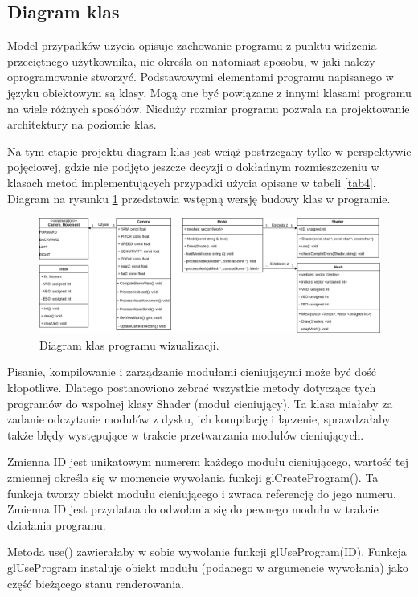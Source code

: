 \subsection{Diagram klas}
Model przypadków użycia opisuje zachowanie programu z punktu widzenia przeciętnego użytkownika, nie określa on natomiast sposobu, w jaki
należy oprogramowanie stworzyć. Podstawowymi elementami programu napisanego w języku obiektowym są klasy. Mogą one być powiązane z innymi klasami programu na wiele różnych sposóbów. Nieduży rozmiar programu pozwala na projektowanie architektury na poziomie klas.

Na tym etapie projektu diagram klas jest wciąż postrzegany tylko w perspektywie pojęciowej, gdzie nie podjęto jeszcze decyzji o dokładnym rozmieszczeniu w klasach metod implementujących przypadki użycia opisane w tabeli \ref{tab4}. Diagram na rysunku \ref{rys24} przedstawia wstępną wersję budowy klas w programie. 

\begin{figure}[H]
		\centering
 		\includegraphics[width=16.0cm]{DiagramKlas.png}
    	\caption{Diagram klas programu wizualizacji.}
 		\label{rys24}
\end{figure}


Pisanie, kompilowanie i zarządzanie modułami cieniującymi może być dość kłopotliwe. Dlatego postanowiono zebrać wszystkie metody dotyczące tych programów do wspolnej klasy Shader (moduł cieniujący). Ta klasa miałaby za zadanie odczytanie modułów z dysku, ich kompilację i łączenie, sprawdzałaby także błędy występujące w trakcie przetwarzania modułów cieniujących.

Zmienna ID jest unikatowym numerem każdego modułu cieniującego, wartość tej zmiennej określa się w momencie wywołania funkcji glCreateProgram(). Ta funkcja tworzy obiekt modułu cieniującego i zwraca referencję do jego numeru. Zmienna ID jest przydatna do odwołania się do pewnego modułu w trakcie działania programu.

Metoda use() zawierałaby w sobie wywołanie funkcji glUseProgram(ID). Funkcja glUseProgram instaluje obiekt modułu (podanego w argumencie wywołania) jako część bieżącego stanu renderowania.

